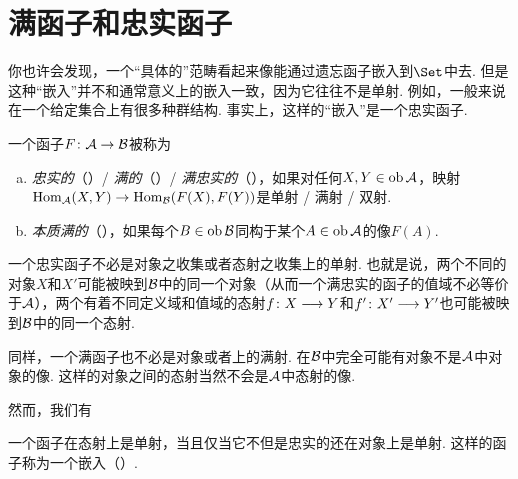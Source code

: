 \section{满函子和忠实函子}
  你也许会发现，一个``具体的''范畴看起来像能通过遗忘函子嵌入到$\Set$中去. 但是这种``嵌入''并不和通常意义上的嵌入一致，因为它往往不是单射. 例如，一般来说在一个给定集合上有很多种群结构. 事实上，这样的``嵌入''是一个忠实函子.
  \begin{defn}
  一个函子$F\colon {\cal A}\to{\cal B}$被称为
  \begin{enumerate}[a)]
    \item \emph{忠实的}（）/
    \emph{满的}（）/
    \emph{满忠实的}（），如果对任何$X,Y\in\operatorname{ob}{\cal A}$，映射$\operatorname{Hom}_{{\cal A}}(X,Y)\to\operatorname{Hom}_{{\cal B}}(F(X),F(Y))$是单射 / 满射 / 双射.
    \item \emph{本质满的}（），如果每个$B\in\operatorname{ob}{\cal B}$同构于某个$A\in\operatorname{ob}{\cal A}$的像$F(A)$.
  \end{enumerate}
  \end{defn}
  \begin{rem}
   一个忠实函子不必是对象之收集或者态射之收集上的单射. 也就是说，两个不同的对象$X$和$X'$可能被映到${\cal B}$中的同一个对象（从而一个满忠实的函子的值域不必等价于${\cal A}$），两个有着不同定义域和值域的态射$f \colon X\longrightarrow Y$和$f' \colon X'\longrightarrow Y'$也可能被映到${\cal B}$中的同一个态射.

  同样，一个满函子也不必是对象或者上的满射. 在${\cal B}$中完全可能有对象不是${\cal A}$中对象的像. 这样的对象之间的态射当然不会是${\cal A}$中态射的像.
  \end{rem}

  然而，我们有
  \begin{prop}
    一个函子在态射上是单射，当且仅当它不但是忠实的还在对象上是单射.
    这样的函子称为一个嵌入（）.
  \end{prop}

